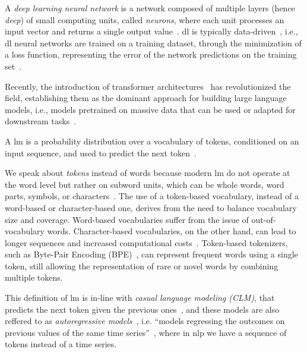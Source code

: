 A \emph{deep learning neural network} is a network composed of multiple layers (hence \emph{deep}) of small computing units, called \emph{neurons}, where each unit processes an input vector and returns a single output value~\cite{jm3}.
%
\Acf{dl} is typically data-driven~\cite{jm3}, i.e., \ac{dl} neural networks are trained on a training dataset, through the minimization of a loss function, representing the error of the network predictions on the training set~\cite{hastie2009elements}.

Recently, the introduction of transformer architectures~\cite{vaswani_transformers_2017} has revolutionized the field, establishing them as the dominant approach for building large language models, i.e., models pretrained on massive data that can be used or adapted for downstream tasks~\cite{gu2024mamba}.
\begin{definition}
     A \acf{lm} is a probability distribution over a vocabulary of tokens, conditioned on an input sequence, and used to predict the next token~\cite{lm_java_methods_2023,jm3}.
\end{definition}
We speak about \emph{tokens} instead of words because modern \ac{lm} do not operate at the word level but rather on subword units, which can be whole words, word parts, symbols, or characters~\cite{comprensive_overview_llm_2025}. The use of a token-based vocabulary, instead of a word-based or character-based one, derives from the need to balance vocabulary size and coverage. Word-based vocabularies suffer from the issue of out-of-vocabulary words. Character-based vocabularies, on the other hand, can lead to longer sequences and increased computational costs~\cite{sun-etal-2023-characters}. Token-based tokenizers, such as Byte-Pair Encoding (BPE)~\cite{sennrich-etal-2016-neural}, can represent frequent words using a single token, still allowing the representation of rare or novel words by combining multiple tokens.

This definition of \ac{lm} is in-line with \emph{casual language modeling (CLM)}, that predicts the next token given the previous ones~\cite{jain-etal-2023-cl-for-causal-lm,jm3}, and these models are also reffered to as \emph{autoregressive models}~\cite{jm3}, i.e. ``models regressing the outcomes on previous values of the same time series''~\cite{regis2022_autoregressive}, where in \ac{nlp} we have a sequence of tokens instead of a time series.

